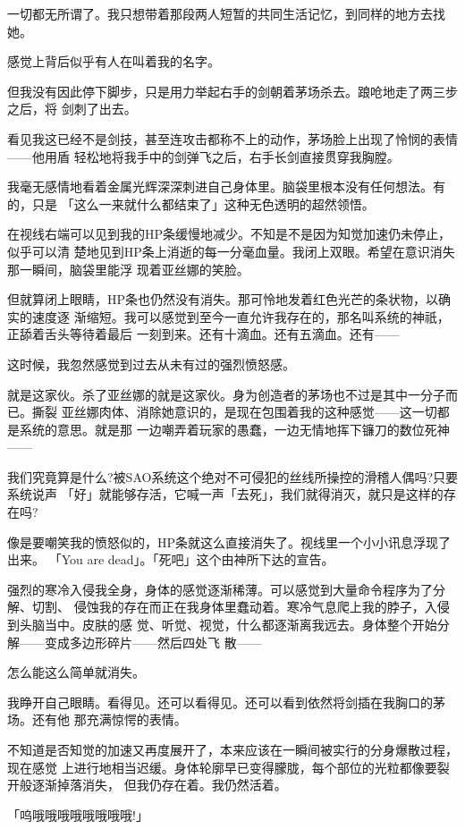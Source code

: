 \documentclass[11pt]{book}
\begin{document}
一切都无所谓了。我只想带着那段两人短暂的共同生活记忆，到同样的地方去找她。

感觉上背后似乎有人在叫着我的名字。

但我没有因此停下脚步，只是用力举起右手的剑朝着茅场杀去。踉呛地走了两三步之后，将
剑刺了出去。

看见我这已经不是剑技，甚至连攻击都称不上的动作，茅场脸上出现了怜悯的表情——他用盾
轻松地将我手中的剑弹飞之后，右手长剑直接贯穿我胸膛。

我毫无感情地看着金属光辉深深刺进自己身体里。脑袋里根本没有任何想法。有的，只是
「这么一来就什么都结束了」这种无色透明的超然领悟。

在视线右端可以见到我的HP条缓慢地减少。不知是不是因为知觉加速仍未停止，似乎可以清
楚地见到HP条上消逝的每一分毫血量。我闭上双眼。希望在意识消失那一瞬间，脑袋里能浮
现着亚丝娜的笑脸。

但就算闭上眼睛，HP条也仍然没有消失。那可怜地发着红色光芒的条状物，以确实的速度逐
渐缩短。我可以感觉到至今一直允许我存在的，那名叫系统的神祇，正舔着舌头等待着最后
一刻到来。还有十滴血。还有五滴血。还有——

这时候，我忽然感觉到过去从未有过的强烈愤怒感。

就是这家伙。杀了亚丝娜的就是这家伙。身为创造者的茅场也不过是其中一分子而已。撕裂
亚丝娜肉体、消除她意识的，是现在包围着我的这种感觉——这一切都是系统的意思。就是那
一边嘲弄着玩家的愚蠢，一边无情地挥下镰刀的数位死神——

我们究竟算是什么?被SAO系统这个绝对不可侵犯的丝线所操控的滑稽人偶吗?只要系统说声
「好」就能够存活，它喊一声「去死」，我们就得消灭，就只是这样的存在吗?

像是要嘲笑我的愤怒似的，HP条就这么直接消失了。视线里一个小小讯息浮现了出来。
「You are dead」。「死吧」这个由神所下达的宣告。

强烈的寒冷入侵我全身，身体的感觉逐渐稀薄。可以感觉到大量命令程序为了分解、切割、
侵蚀我的存在而正在我身体里蠢动着。寒冷气息爬上我的脖子，入侵到头脑当中。皮肤的感
觉、听觉、视觉，什么都逐渐离我远去。身体整个开始分解——变成多边形碎片——然后四处飞
散——

怎么能这么简单就消失。

我睁开自己眼睛。看得见。还可以看得见。还可以看到依然将剑插在我胸口的茅场。还有他
那充满惊愕的表情。

不知道是否知觉的加速又再度展开了，本来应该在一瞬间被实行的分身爆散过程，现在感觉
上进行地相当迟缓。身体轮廓早已变得朦胧，每个部位的光粒都像要裂开般逐渐掉落消失，
但我仍存在着。我仍然活着。

「呜哦哦哦哦哦哦哦哦!」
\end{document}
